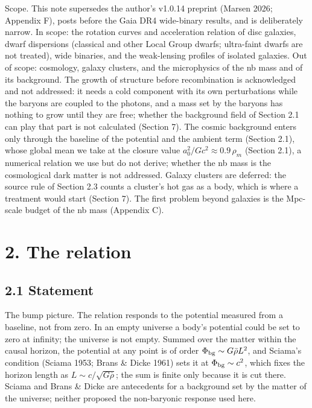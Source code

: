 \documentclass[
  10pt,
]{article}
\begin{document}
Scope. This note supersedes the author's v1.0.14 preprint (Marsen 2026; Appendix F),
posts before the Gaia DR4 wide-binary results, and is deliberately narrow.
In scope: the rotation curves and acceleration relation of disc galaxies,
dwarf dispersions (classical and other Local Group dwarfs; ultra-faint dwarfs are not treated), wide binaries, and the weak-lensing profiles of
isolated galaxies. Out of scope: cosmology, galaxy clusters, and the microphysics of the nb mass and of its background. The growth of structure before recombination is acknowledged and not addressed: it needs a cold component with its own perturbations while the baryons are coupled to the photons, and a mass set by the baryons has nothing to grow until they are free; whether the background field of Section 2.1 can play that part is not calculated (Section 7). The cosmic background enters only through the baseline of the potential and the ambient term (Section 2.1), whose global mean we take
at the closure value $a_0^2/Gc^2\approx0.9\,\rho_m$ (Section 2.1), a
numerical relation we use but do not derive; whether the nb mass is the
cosmological dark matter is not addressed. Galaxy clusters are deferred:
the source rule of Section 2.3 counts a cluster's hot gas as a body, which
is where a treatment would start (Section 7). The first problem beyond
galaxies is the Mpc-scale budget of the nb mass (Appendix C).

\section{2. The relation}\label{the-law}

\subsection{2.1 Statement}\label{statement}

The bump picture. The relation responds to the potential measured from a baseline, not from zero. In an empty universe a body's potential could be set to zero at infinity; the universe is not empty. Summed over the matter within the causal horizon, the potential at any point is of order $\Phi_{\rm bg}\sim G\bar\rho L^2$, and Sciama's condition (Sciama 1953; Brans \& Dicke 1961) sets it at $\Phi_{\rm bg}\sim c^2$, which fixes the horizon length as $L\sim c/\sqrt{G\bar\rho}$; the sum is finite only because it is cut there. Sciama and Brans \& Dicke are antecedents for a background set by the matter of the universe; neither proposed the non-baryonic response used here.
\end{document}
